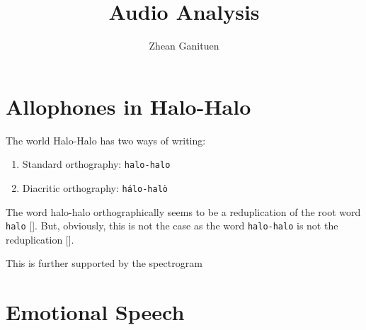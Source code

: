 \documentclass{article}
\title{Audio Analysis}
\author{Zhean Ganituen}
\begin{document}
\maketitle

\section{Allophones in Halo-Halo}

The world Halo-Halo has two ways of writing:
\begin{enumerate}
    \item Standard orthography: \texttt{halo-halo}
    \item Diacritic orthography: \texttt{hálo-halò}
\end{enumerate}

The word halo-halo orthographically seems to be a reduplication of the root word 
\texttt{halo} []. But, obviously, this is not the case as the word
\texttt{halo-halo} is not the reduplication [].

This is further supported by the spectrogram

\section{Emotional Speech}
\end{document}
